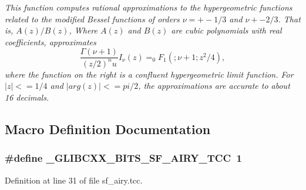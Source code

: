 \begin{DoxyCompactItemize}
\begin{DoxyCompactList}\small\item\em This function computes rational approximations to the hypergeometric functions related to the modified Bessel functions of orders $ \nu = +-1/3 $ and $ \nu +- 2/3 $. That is, $ A(z)/B(z) $, Where $ A(z) $ and $ B(z) $ are cubic polynomials with real coefficients, approximates \[ \frac{\Gamma(\nu+1)}{(z/2)^nu}I_\nu(z) = _0F_1 (;\nu+1;z^2/4), \] where the function on the right is a confluent hypergeometric limit function. For $ |z| <= 1/4 $ and $ |arg(z)| <= pi/2 $, the approximations are accurate to about 16 decimals. \end{DoxyCompactList}\end{DoxyCompactItemize}


\subsection{Macro Definition Documentation}
\hypertarget{sf__airy_8tcc_a2368d5b1edfb2e14f2c283d87ab89943}{}
\subsubsection[{\+\_\+\+G\+L\+I\+B\+C\+X\+X\+\_\+\+B\+I\+T\+S\+\_\+\+S\+F\+\_\+\+A\+I\+R\+Y\+\_\+\+T\+C\+C}]{\setlength{\rightskip}{0pt plus 5cm}\#define \+\_\+\+G\+L\+I\+B\+C\+X\+X\+\_\+\+B\+I\+T\+S\+\_\+\+S\+F\+\_\+\+A\+I\+R\+Y\+\_\+\+T\+C\+C~1}\label{sf__airy_8tcc_a2368d5b1edfb2e14f2c283d87ab89943}


Definition at line 31 of file sf\+\_\+airy.\+tcc.

